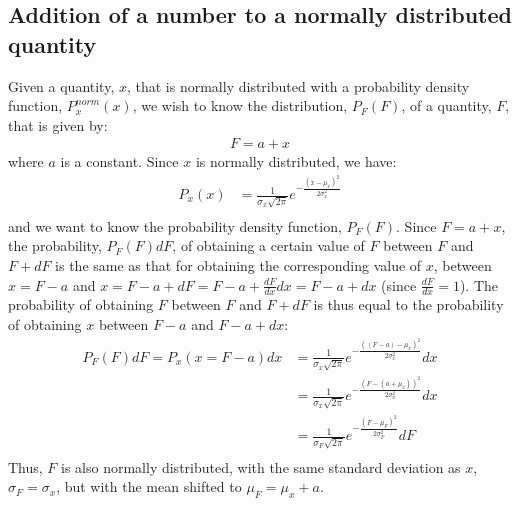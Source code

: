 \subsection{Addition of a number to a normally distributed quantity}
Given a quantity, $x$, that is normally distributed with a probability density function, $P^{norm}_x(x)$, we wish to know the distribution, $P_F(F)$, of a quantity, $F$, that is given by:
\begin{align*}
F=a+x
\end{align*}
where $a$ is a constant. Since $x$ is normally distributed, we have:
\begin{align*}
P_x(x)&=\frac{1}{\sigma_x\sqrt{2\pi}}e^{-\frac{(x-\mu_x)^2}{2\sigma_x^2}}\\
\end{align*}
and we want to know the probability density function, $P_F(F)$. Since $F=a+x$, the probability, $P_F(F)dF$, of obtaining a certain value of $F$ between $F$ and $F+dF$ is the same as that for obtaining the corresponding value of $x$, between $x=F-a$ and $x=F-a+dF=F-a+\frac{dF}{dx}dx = F-a+dx$ (since $\frac{dF}{dx}=1$). The probability of obtaining $F$ between $F$ and $F+dF$ is thus equal to the probability of obtaining $x$ between $F-a$ and $F-a+dx$:
\begin{align}
\label{eqn:normsumconstant}
P_F(F)dF=P_x(x=F-a)dx&=\frac{1}{\sigma_x\sqrt{2\pi}}e^{-\frac{((F-a)-\mu_x)^2}{2\sigma_x^2}}dx\\
&=\frac{1}{\sigma_x\sqrt{2\pi}}e^{-\frac{(F-(a+\mu_x))^2}{2\sigma_x^2}}dx\\
&=\frac{1}{\sigma_F\sqrt{2\pi}}e^{-\frac{(F-\mu_F)^2}{2\sigma_F^2}}dF\\
\end{align}
Thus, $F$ is also normally distributed, with the same standard deviation as $x$, $\sigma_F=\sigma_x$, but with the mean shifted to $\mu_F=\mu_x+a$.
